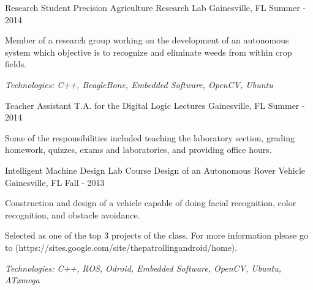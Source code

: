 \begin{cventries}
	\cventry
		{Research Student} %
		{Precision Agriculture Research Lab} %
		{Gainesville, FL} %
		{Summer - 2014} %
		{
			\begin{cvitems} %
			\item {Member of a research group working on the development of an autonomous system which 
				objective is to recognize and eliminate weeds from within crop fields.}
			\item {\it{Technologies:} C++, BeagleBone, Embedded Software, OpenCV, Ubuntu}
			\end{cvitems}
		}

	\cventry
		{Teacher Assistant} %
		{T.A. for the Digital Logic Lectures} %
		{Gainesville, FL} %
		{Summer - 2014} %
		{
			\begin{cvitems} %
			\item {Some of the responsibilities included teaching the laboratory section, grading homework, quizzes, exams and
				laboratories, and providing office hours.}
			\end{cvitems}
		}

	\cventry
		{Intelligent Machine Design Lab Course} %
		{Design of an Autonomous Rover Vehicle} %
		{Gainesville, FL} %
		{Fall - 2013} %
		{
			\begin{cvitems} %
				\item {Construction and design of a vehicle capable of doing facial recognition, color recognition, and
					obstacle avoidance.}
				\item {Selected as one of the top 3 projects of the class. For more information please go to
					(https://sites.google.com/site/thepatrollingandroid/home).}
				\item {\it{Technologies:} C++, ROS, Odroid, Embedded Software, OpenCV, Ubuntu, ATxmega}
			\end{cvitems}
		}

\end{cventries}
